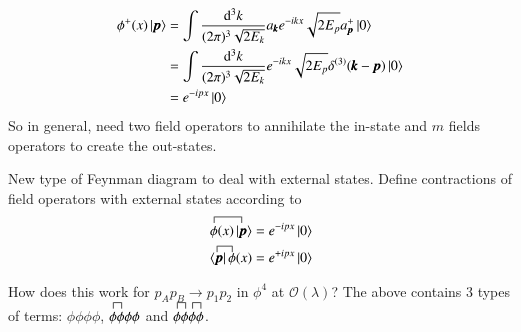 \begin{align*}
	\phi^+(x) \ket{\pmb{p}} &= \int \frac{\dd^3 k}{(2\pi)^3 \sqrt{2E_k}} a_{\pmb{k}} e^{-ikx}\sqrt{2E_p} a^+_{\pmb{p}} \ket{0}\\
							&= \int \frac{\dd^3 k}{(2\pi)^3 \sqrt{2E_k}} e^{-ikx}\sqrt{2E_p} \delta^{(3)}(\pmb{k}-\pmb{p}) \ket{0}\\
							&= e^{-ipx} \ket{0}
\end{align*}
So in general, need two field operators to annihilate the in-state and $m$ fields operators to create the out-states.

New type of Feynman diagram to deal with external states. Define contractions of field operators with external states according to 
\begin{align*}
	\contraction{}{\phi}{(x)|}{\pmb{p}} \phi(x) \ket{\pmb{p}} &= e^{-ipx}\ket{0} \\%
	\contraction{\langle}{\pmb{p}}{|\;}{\phi} \bra{\pmb{p}}\phi(x)  &= e^{+ipx}\ket{0} 
\end{align*}

How does this work for $p_A p_B \rightarrow p_1 p_2$ in $\phi^4$ at $\mathcal{O}(\lambda)$? The above contains 3 types of terms: $\phi\phi\phi\phi$, $\contraction{}{\phi}{}{\phi}\phi\phi\phi\phi$ and $\contraction{}{\phi}{}{\phi}\phi\phi \contraction{}{\phi}{}{\phi}\phi\phi$.

